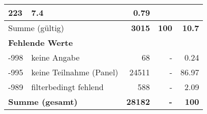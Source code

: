\begin{longtable}{lXrrr}
       \num{223} &
       \num[round-mode=places,round-precision=2]{7.4} &
         \num[round-mode=places,round-precision=2]{0.79} \\
     \midrule
     \multicolumn{2}{l}{Summe (gültig)} &
       \textbf{\num{3015}} &
     \textbf{\num{100}} &
       \textbf{\num[round-mode=places,round-precision=2]{10.7}} \\
     \multicolumn{5}{l}{\textbf{Fehlende Werte}}\\
       -998 &
       keine Angabe &
         \num{68} &
        - &
         \num[round-mode=places,round-precision=2]{0.24} \\
       -995 &
       keine Teilnahme (Panel) &
         \num{24511} &
        - &
         \num[round-mode=places,round-precision=2]{86.97} \\
       -989 &
       filterbedingt fehlend &
         \num{588} &
        - &
         \num[round-mode=places,round-precision=2]{2.09} \\
     \midrule
     \multicolumn{2}{l}{\textbf{Summe (gesamt)}} &
          \textbf{\num{28182}} &
        \textbf{-} &
        \textbf{\num{100}} \\
     \bottomrule
     \end{longtable}
     
